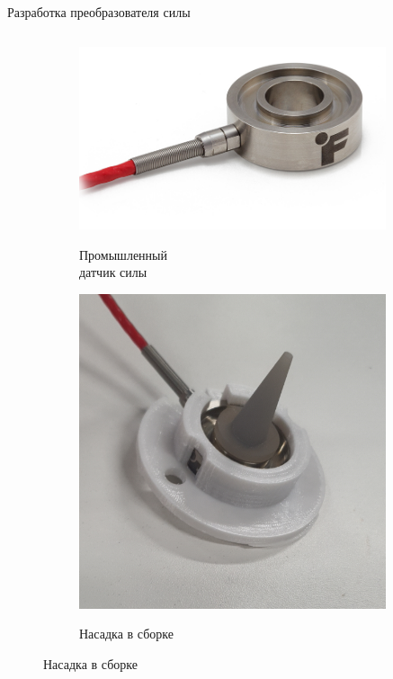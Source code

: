 \documentclass[aspectratio=169,xcolor=table,10pt]{beamer}
\begin{document}
\begin{frame}[t]{Разработка преобразователя силы}
\begin{columns}[T,onlytextwidth]
\begin{column}{0.39\textwidth}
            \begin{figure}[H]
                \begin{subfigure}[t]{0.6\textwidth}
                    \centering\includegraphics[width=0.99\textwidth]{LTH350-DONUT-LOAD-CELL-1.png}\\
                    \caption*{\normalsize Промышленный \\ датчик силы}
                    \label{fig:futek}
                \end{subfigure}
                \vspace{-0.2cm}

                \begin{subfigure}[t]{0.6\textwidth}
                    \centering\includegraphics[width=0.99\textwidth]{point_load.JPG}\\
                    \caption*{\normalsize Насадка в сборке}
                    \label{fig:point_load}
                \end{subfigure}
            \end{figure}


\end{column}
\end{columns}
\end{frame}
\end{document}

